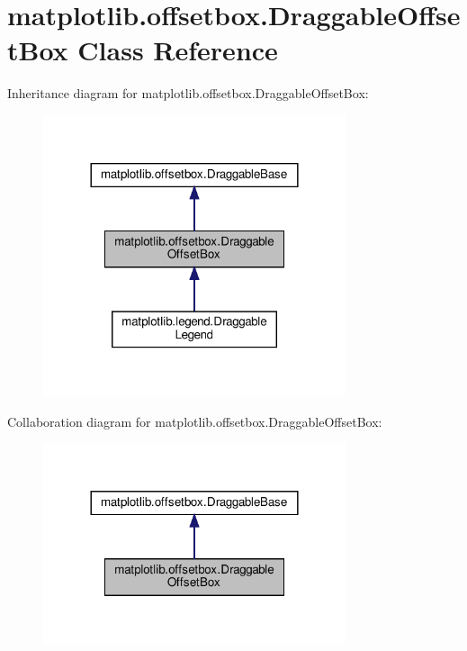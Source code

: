 \hypertarget{classmatplotlib_1_1offsetbox_1_1DraggableOffsetBox}{}\section{matplotlib.\+offsetbox.\+Draggable\+Offset\+Box Class Reference}
\label{classmatplotlib_1_1offsetbox_1_1DraggableOffsetBox}


Inheritance diagram for matplotlib.\+offsetbox.\+Draggable\+Offset\+Box\+:
\nopagebreak
\begin{figure}[H]
\begin{center}
\leavevmode
\includegraphics[width=252pt]{classmatplotlib_1_1offsetbox_1_1DraggableOffsetBox__inherit__graph}
\end{center}
\end{figure}


Collaboration diagram for matplotlib.\+offsetbox.\+Draggable\+Offset\+Box\+:
\nopagebreak
\begin{figure}[H]
\begin{center}
\leavevmode
\includegraphics[width=252pt]{classmatplotlib_1_1offsetbox_1_1DraggableOffsetBox__coll__graph}
\end{center}
\end{figure}
